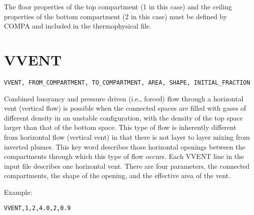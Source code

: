 The floor properties of the top compartment (1 in this case) and the ceiling properties of the bottom compartment (2 in this case) must be defined by COMPA and included in the thermophysical file.

\section{VVENT}

\begin{lstlisting}
VVENT, FROM_COMPARTMENT, TO_COMPARTMENT, AREA, SHAPE, INITIAL_FRACTION
\end{lstlisting}

Combined buoyancy and pressure driven (i.e., forced) flow through a horizontal vent (vertical flow) is possible when the connected spaces are filled with gases of different density in an unstable configuration, with the density of the top space larger than that of the bottom space. This type of flow is inherently different from horizontal flow (vertical vent) in that there is not layer to layer mixing from inverted plumes. This key word describes those horizontal openings between the compartments through which this type of flow occurs. Each VVENT line in the input file describes one horizontal vent.  There are four parameters, the connected compartments, the shape of the opening, and the effective area of the vent.

Example:

\begin{lstlisting}
VVENT,1,2,4.0,2,0.9
\end{lstlisting}